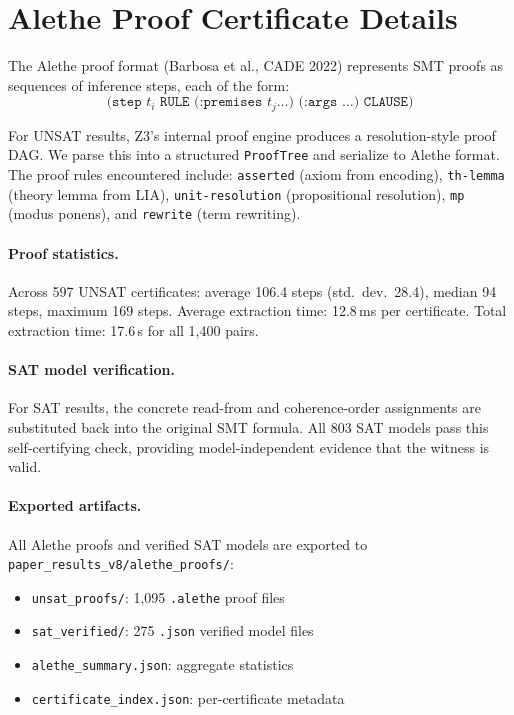 \documentclass[11pt]{article}
\begin{document}
\section{Alethe Proof Certificate Details}
\label{app:alethe-details}

The Alethe proof format (Barbosa et al., CADE 2022) represents
SMT proofs as sequences of inference steps, each of the form:
\[
\texttt{(step } t_i \texttt{ RULE (:premises } t_j \ldots \texttt{) (:args \ldots) CLAUSE)}
\]

For UNSAT results, Z3's internal proof engine produces a resolution-style
proof DAG.  We parse this into a structured \texttt{ProofTree} and serialize
to Alethe format.  The proof rules encountered include:
\texttt{asserted} (axiom from encoding), \texttt{th-lemma} (theory lemma
from LIA), \texttt{unit-resolution} (propositional resolution),
\texttt{mp} (modus ponens), and \texttt{rewrite} (term rewriting).

\paragraph{Proof statistics.}
Across 597 UNSAT certificates:
average 106.4 steps (std.\ dev.\ 28.4),
median 94 steps, maximum 169 steps.
Average extraction time: 12.8\,ms per certificate.
Total extraction time: 17.6\,s for all 1{,}400 pairs.

\paragraph{SAT model verification.}
For SAT results, the concrete read-from and coherence-order assignments
are substituted back into the original SMT formula.  All 803 SAT models
pass this self-certifying check, providing model-independent evidence
that the witness is valid.

\paragraph{Exported artifacts.}
All Alethe proofs and verified SAT models are exported to
\texttt{paper\_results\_v8/alethe\_proofs/}:
\begin{itemize}[nosep]
\item \texttt{unsat\_proofs/}: 1{,}095 \texttt{.alethe} proof files
\item \texttt{sat\_verified/}: 275 \texttt{.json} verified model files
\item \texttt{alethe\_summary.json}: aggregate statistics
\item \texttt{certificate\_index.json}: per-certificate metadata
\end{itemize}
\end{document}
